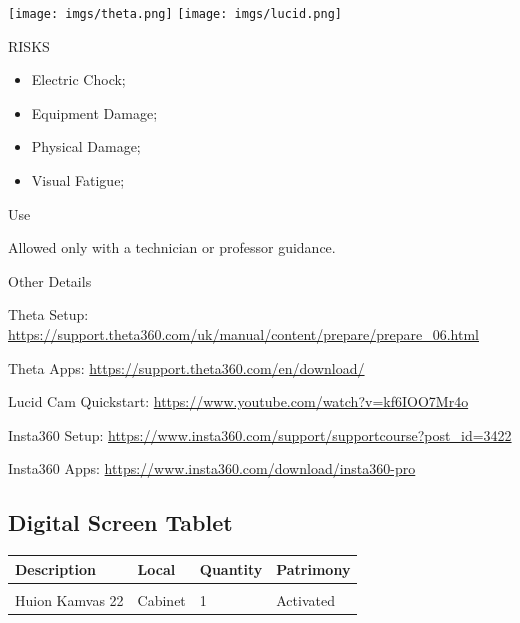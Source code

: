 \begin{multicols}{2}

\texttt{[image: imgs/theta.png]}
\texttt{[image: imgs/lucid.png]}


\columnbreak

\begin{mdframed}[roundcorner=10pt, linecolor=red, linewidth=2pt]
\vspace{1em}
{\Large {\color{red}RISKS}}
\vspace{1em}

\begin{itemize}
    \item Electric Chock;
    \item Equipment Damage;
    \item Physical Damage;
    \item Visual Fatigue; 
\end{itemize}

\vspace{1em}
\end{mdframed}

\vspace{2em}

{\Large Use}
\vspace{1em}

Allowed only with a technician or professor guidance.
\end{multicols}

{\Large Other Details}
\vspace{1em}

Theta Setup: \url{https://support.theta360.com/uk/manual/content/prepare/prepare_06.html}

Theta Apps: \url{https://support.theta360.com/en/download/}

Lucid Cam Quickstart: \url{https://www.youtube.com/watch?v=kf6IOO7Mr4o}

Insta360 Setup: \url{https://www.insta360.com/support/supportcourse?post_id=3422}

Insta360 Apps: \url{https://www.insta360.com/download/insta360-pro}
\newpage

\subsection{Digital Screen Tablet}
\begin{tabularx}{\textwidth}{ Y  Y  Y  Y }
    \textbf{Description} &  \textbf{Local} &  \textbf{Quantity} & \textbf{Patrimony}\\
    \hline \\
     Huion Kamvas 22 & Cabinet & 1 & Activated
\end{tabularx}
\vspace{1cm}

